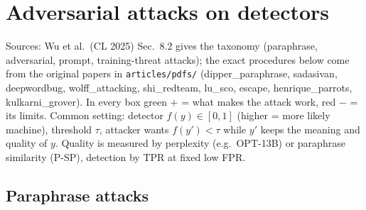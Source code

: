 \documentclass[10pt,a4paper,twocolumn]{article}
\begin{document}
\section{Adversarial attacks on detectors}
Sources: Wu et al.\ (CL 2025) Sec.~8.2 gives the taxonomy (paraphrase, adversarial, prompt, training-threat attacks); the exact procedures below come from the original papers in \texttt{articles/pdfs/} (dipper\_paraphrase, sadasivan, deepwordbug, wolff\_attacking, shi\_redteam, lu\_sco, escape, henrique\_parrots, kulkarni\_grover). In every box green $+$ = what makes the attack work, red $-$ = its limits. Common setting: detector $f(y)\in[0,1]$ (higher = more likely machine), threshold $\tau$, attacker wants $f(y')<\tau$ while $y'$ keeps the meaning and quality of $y$. Quality is measured by perplexity (e.g.\ OPT-13B) or paraphrase similarity (P-SP), detection by TPR at fixed low FPR.

\subsection*{Paraphrase attacks}
\end{document}
